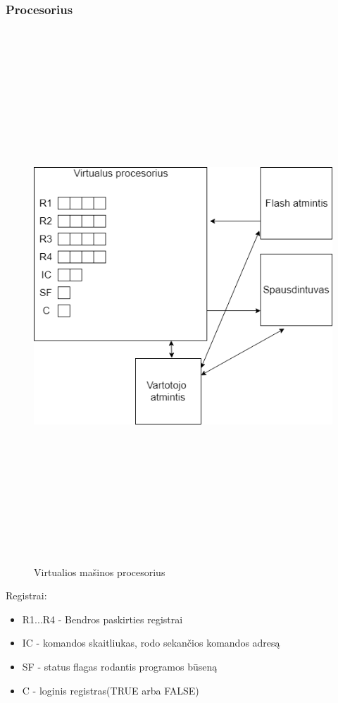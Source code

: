 \documentclass[oneside]{VUMIFPSkursinis}
\begin{document}
	\subsubsection{Procesorius}
\begin{figure}[H]
		\centering	
	\includegraphics[width=18cm,height=20cm,keepaspectratio]{VMProcesorius.png}
	\caption{Virtualios mašinos procesorius}
	\label{fig:Virtualios mašinos procesorius}
\end{figure}
Registrai:
\begin{itemize}
	\item{R1...R4 - Bendros paskirties registrai}
	\item{IC - komandos skaitliukas, rodo sekančios komandos adresą }
	\item{SF - status flagas rodantis programos būseną}
	\item{C - loginis registras(TRUE arba FALSE)}

\end{itemize}
\end{document}
